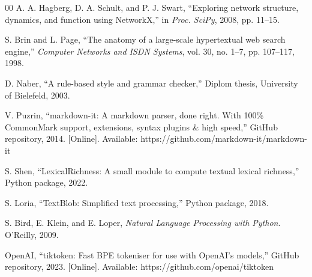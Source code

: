 \documentclass[conference]{IEEEtran}
\begin{document}
\begin{thebibliography}{00}
 A. A. Hagberg, D. A. Schult, and P. J. Swart, ``Exploring network structure, dynamics, and function using NetworkX,'' in \emph{Proc. SciPy}, 2008, pp. 11--15.

 S. Brin and L. Page, ``The anatomy of a large-scale hypertextual web search engine,'' \emph{Computer Networks and ISDN Systems}, vol. 30, no. 1--7, pp. 107--117, 1998.

 D. Naber, ``A rule-based style and grammar checker,'' Diplom thesis, University of Bielefeld, 2003.

 V. Puzrin, ``markdown-it: A markdown parser, done right. With 100\% CommonMark support, extensions, syntax plugins \& high speed,'' GitHub repository, 2014. [Online]. Available: https://github.com/markdown-it/markdown-it

 S. Shen, ``LexicalRichness: A small module to compute textual lexical richness,'' Python package, 2022.

 S. Loria, ``TextBlob: Simplified text processing,'' Python package, 2018.

 S. Bird, E. Klein, and E. Loper, \emph{Natural Language Processing with Python}. O'Reilly, 2009.

 OpenAI, ``tiktoken: Fast BPE tokeniser for use with OpenAI's models,'' GitHub repository, 2023. [Online]. Available: https://github.com/openai/tiktoken

\end{thebibliography}
\end{document}
